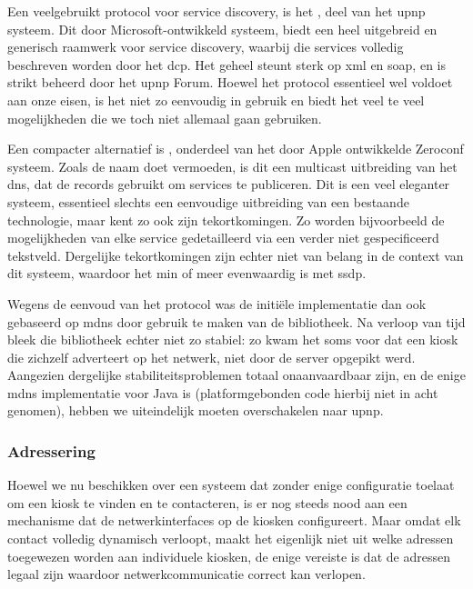 Een veelgebruikt protocol voor service discovery, is het , deel van het \ac{upnp} systeem. Dit door Microsoft-ontwikkeld systeem, biedt een heel uitgebreid en generisch raamwerk voor service discovery, waarbij die services volledig beschreven worden door het \ac{dcp}. Het geheel steunt sterk op \ac{xml} en \ac{soap}, en is strikt beheerd door het \ac{upnp} Forum. Hoewel het protocol essentieel wel voldoet aan onze eisen, is het niet zo eenvoudig in gebruik en biedt het veel te veel mogelijkheden die we toch niet allemaal gaan gebruiken.

Een compacter alternatief is , onderdeel van het door Apple ontwikkelde Zeroconf systeem. Zoals de naam doet vermoeden, is dit een multicast uitbreiding van het \ac{dns}, dat de  records gebruikt om services te publiceren. Dit is een veel eleganter systeem, essentieel slechts een eenvoudige uitbreiding van een bestaande technologie, maar kent zo ook zijn tekortkomingen. Zo worden bijvoorbeeld de mogelijkheden van elke service gedetailleerd via een verder niet gespecificeerd tekstveld. Dergelijke tekortkomingen zijn echter niet van belang in de context van dit systeem, waardoor het min of meer evenwaardig is met \ac{ssdp}.

Wegens de eenvoud van het protocol was de initiële implementatie dan ook gebaseerd op \ac{mdns} door gebruik te maken van de  bibliotheek. Na verloop van tijd bleek die bibliotheek echter niet zo stabiel: zo kwam het soms voor dat een kiosk die zichzelf adverteert op het netwerk, niet door de server opgepikt werd. Aangezien dergelijke stabiliteitsproblemen totaal onaanvaardbaar zijn, en  de enige \ac{mdns} implementatie voor Java is (platformgebonden code hierbij niet in acht genomen), hebben we uiteindelijk moeten overschakelen naar \ac{upnp}.

\subsubsection{Adressering}

Hoewel we nu beschikken over een systeem dat zonder enige configuratie toelaat om een kiosk te vinden en te contacteren, is er nog steeds nood aan een mechanisme dat de netwerkinterfaces op de kiosken configureert. Maar omdat elk contact volledig dynamisch verloopt, maakt het eigenlijk niet uit welke adressen toegewezen worden aan individuele kiosken, de enige vereiste is dat de adressen legaal zijn waardoor netwerkcommunicatie correct kan verlopen.

